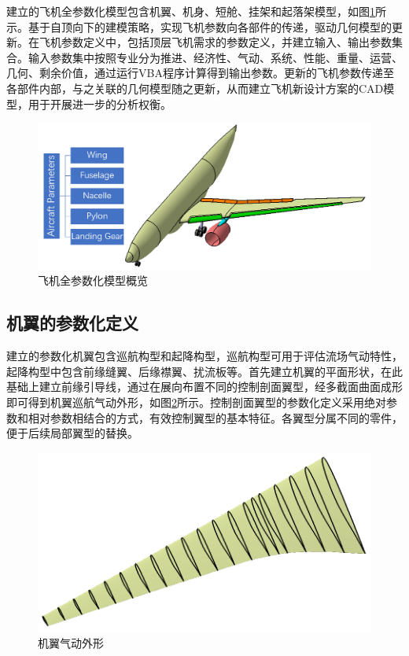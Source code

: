 \documentclass[12pt,a4paper]{report}
\begin{document}
建立的飞机全参数化模型包含机翼、机身、短舱、挂架和起落架模型，如图\ref{fig:ModelOverview}所示。基于自顶向下的建模策略，实现飞机参数向各部件的传递，驱动几何模型的更新。在飞机参数定义中，包括顶层飞机需求的参数定义，并建立输入、输出参数集合。输入参数集中按照专业分为推进、经济性、气动、系统、性能、重量、运营、几何、剩余价值，通过运行VBA程序计算得到输出参数。更新的飞机参数传递至各部件内部，与之关联的几何模型随之更新，从而建立飞机新设计方案的CAD模型，用于开展进一步的分析权衡。

\begin{figure}[hbt!]
\centering
\includegraphics[width=.8\textwidth]{ModelOverview.PNG}
\caption{飞机全参数化模型概览}
\label{fig:ModelOverview}
\end{figure}

\subsection{机翼的参数化定义}

建立的参数化机翼包含巡航构型和起降构型，巡航构型可用于评估流场气动特性，起降构型中包含前缘缝翼、后缘襟翼、扰流板等。首先建立机翼的平面形状，在此基础上建立前缘引导线，通过在展向布置不同的控制剖面翼型，经多截面曲面成形即可得到机翼巡航气动外形，如图\ref{fig:WingAeroShape}所示。控制剖面翼型的参数化定义采用绝对参数和相对参数相结合的方式，有效控制翼型的基本特征。各翼型分属不同的零件，便于后续局部翼型的替换。

\begin{figure}[hbt!]
\centering
\includegraphics[width=.8\textwidth]{WingAeroShape.PNG}
\caption{机翼气动外形}
\label{fig:WingAeroShape}
\end{figure}
\end{document}
